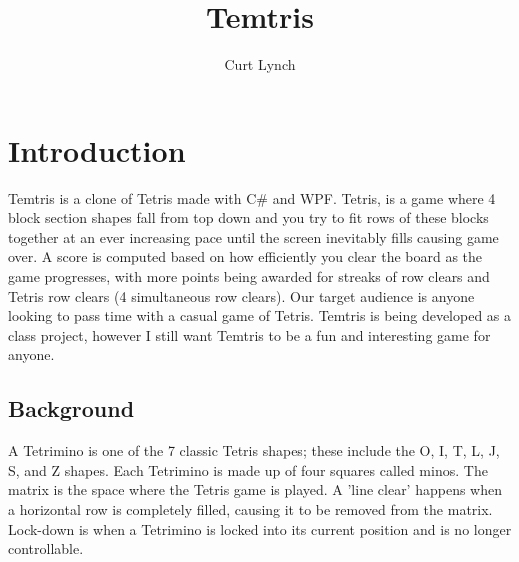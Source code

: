 \documentclass[10pt,conference,onecolumn,compsoc]{IEEEtran}
\begin{document}
\title{Temtris}
%
%


\author{Curt Lynch}


\maketitle

\IEEEdisplaynontitleabstractindextext

\IEEEpeerreviewmaketitle

\section{Introduction}
Temtris is a clone of Tetris made with C\# and WPF. Tetris, is a game where 4 block section shapes fall from top down and you try to fit rows of these blocks together at an ever increasing pace until the screen inevitably fills causing game over. A score is computed based on how efficiently you clear the board as the game progresses, with more points being awarded for streaks of row clears and Tetris row clears (4 simultaneous row clears). Our target audience is anyone looking to pass time with a casual game of Tetris. Temtris is being developed as a class project, however I still want Temtris to be a fun and interesting game for anyone.

\subsection{Background}
A Tetrimino is one of the 7 classic Tetris shapes; these include the O, I, T, L, J, S, and Z shapes. Each Tetrimino is made up of four squares called minos. The matrix is the space where the Tetris game is played. A 'line clear' happens when a horizontal row is completely filled, causing it to be removed from the matrix. Lock-down is when a Tetrimino is locked into its current position and is no longer controllable.
\end{document}
